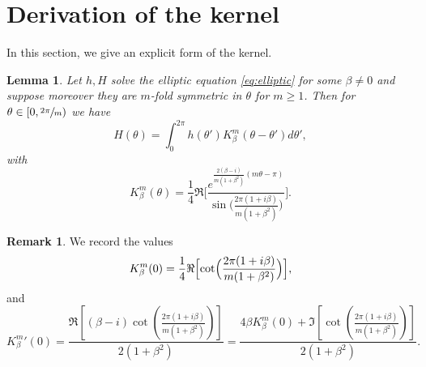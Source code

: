 \documentclass[JEP,XML,SOM,Unicode,NoFloatCountersInSection,published]{cedram}
\theoremstyle{plain}
\newtheorem{lemma}[theorem]{Lemma}
\theoremstyle{definition}
\newtheorem{remark}[theorem]{Remark}
\let\bt\beta
\let\tht\theta
\begin{document}
\appendix
\section{Derivation of the kernel}

In this section, we give an explicit form of the kernel.

\begin{lemma}\label{lem:ker comp}
Let $h, H$ solve the elliptic equation \eqref{eq:elliptic} for some $\bt\ne0$ and suppose moreover they are $m$-fold symmetric in $\theta$ for $m\geq 1$. Then for $\theta \in [0, \sfrac{2\pi}{m})$ we have
\[
H(\tht)=\int_{0}^{2\pi} h(\tht') K^m_{\beta}(\tht-\tht') d\tht',
\]
with
\[
K^m_{\beta}(\theta)= \frac{1}{4}\Re \biggl[\frac{e^{\frac{2(\beta-i)}{m(1+\beta^2)}(m\theta-\pi)}}{\sin\bigl(\frac{2\pi(1+i\beta)}{m(1+\beta^2)}\bigr)}\biggl].
\]
\end{lemma}
\begin{remark}\label{rem:derv ker 0}
We record the values
\[
K_\beta^m(0)=\frac{1}{4}\Re\Bigl[\cot\Bigl(\frac{2\pi(1+i\beta)}{m(1+\beta^2)}\Bigr)\Bigr],
\]
and
\[
{K_\beta^m} '(0)=\frac{\Re\left[(\beta-i)\cot\left(\frac{2\pi(1+i\beta)}{m(1+\beta^2)}\right)\right]}{2(1+\beta^2)}=\frac{4\beta K_\beta^m(0)+\Im\left[\cot\left(\frac{2\pi(1+i\beta)}{m(1+\beta^2)}\right)\right]}{2(1+\beta^2)}.
\]
\end{remark}
\end{document}
